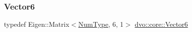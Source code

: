 \mbox{\label{namespacedvo_1_1core_a05327f3312d32a301bce9fccda9e5807}} 
\subsubsection{\texorpdfstring{Vector6}{Vector6}}
{\footnotesize\ttfamily typedef Eigen\+::\+Matrix$<$\mbox{\hyperlink{namespacedvo_1_1core_ab9c199d221775a923e2549ad7e15c323}{Num\+Type}}, 6, 1$>$ \mbox{\hyperlink{namespacedvo_1_1core_a05327f3312d32a301bce9fccda9e5807}{dvo\+::core\+::\+Vector6}}}


